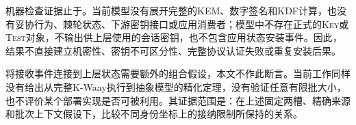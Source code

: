 机器检查证据止于\receiveraccept。当前模型没有展开完整的KEM、数字签名和KDF计算，也没有妥协行为、棘轮状态、下游密钥接口或应用消费者；模型中不存在正式的\textsc{Key}或\textsc{Test}对象，不输出供上层使用的会话密钥，也不包含应用状态安装事件。因此，结果不直接建立机密性、密钥不可区分性、完整协议认证失败或重复安装后果。

将接收事件连接到上层状态需要额外的组合假设，本文不作此断言。当前工作同样没有给出从完整K-Waay执行到抽象模型的精化定理，没有验证任意有限批大小，也不评价某个部署实现是否可被利用。其证据范围是：在上述固定两槽、精确来源和批次上下文假设下，比较不同身份坐标上的接纳限制所保持的关系。
